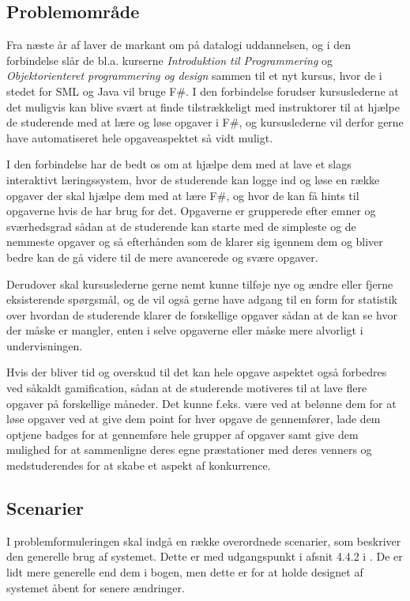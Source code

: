 \documentclass[12pt]{article}
\begin{document}
\subsection{Problemområde}
Fra næste år af laver de markant om på datalogi uddannelsen, og i den forbindelse slår de bl.a. kurserne \emph{Introduktion til Programmering} og \emph{Objektorienteret programmering og design} sammen til et nyt kursus, hvor de i stedet for SML og Java vil bruge F\#.
I den forbindelse forudser kursuslederne at det muligvis kan blive svært at finde tilstrækkeligt med instruktorer til at hjælpe de studerende med at lære og løse opgaver i F\#, og kursuslederne vil derfor gerne have automatiseret hele opgaveaspektet så vidt muligt.

I den forbindelse har de bedt os om at hjælpe dem med at lave et slags interaktivt læringssystem, hvor de studerende kan logge ind og løse en række opgaver der skal hjælpe dem med at lære F\#, og hvor de kan få hints til opgaverne hvis de har brug for det. Opgaverne er grupperede efter emner og sværhedsgrad sådan at de studerende kan starte med de simpleste og de nemmeste opgaver og så efterhånden som de klarer sig igennem dem og bliver bedre kan de gå videre til de mere avancerede og svære opgaver.

Derudover skal kursuslederne gerne nemt kunne tilføje nye og ændre eller fjerne eksisterende spørgsmål, og de vil også gerne have adgang til en form for statistik over hvordan de studerende klarer de forskellige opgaver sådan at de kan se hvor der måske er mangler, enten i selve opgaverne eller måske mere alvorligt i undervisningen.

Hvis der bliver tid og overskud til det kan hele opgave aspektet også forbedres ved såkaldt gamification, sådan at de studerende motiveres til at lave flere opgaver på forskellige måneder. Det kunne f.eks. være ved at belønne dem for at løse opgaver ved at give dem point for hver opgave de gennemfører, lade dem optjene badges for at gennemføre hele grupper af opgaver samt give dem mulighed for at sammenligne deres egne præstationer med deres venners og medstuderendes for at skabe et aspekt af konkurrence.


\subsection{Scenarier}
I problemformuleringen skal indgå en række overordnede scenarier, som beskriver den generelle brug af systemet. Dette er med udgangspunkt i afsnit 4.4.2 i \cite{OOSE}. De er lidt mere generelle end dem i bogen, men dette er for at holde designet af systemet åbent for senere ændringer.
\end{document}
